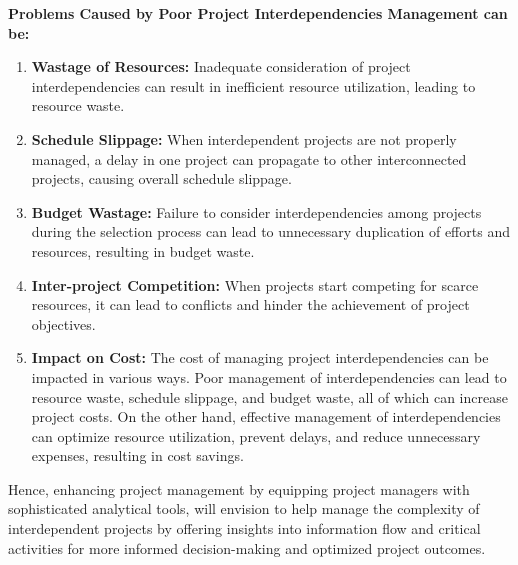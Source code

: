 \documentclass{llncs}
\begin{document}
\textbf{Problems Caused by Poor Project Interdependencies Management can be:}
\begin{enumerate}
\item \textbf{Wastage of Resources:} Inadequate consideration of project interdependencies can result in inefficient resource utilization, leading to resource waste.~\cite{refpaper2}~\cite{refpaper3}
\item \textbf{Schedule Slippage:} When interdependent projects are not properly managed, a delay in one project can propagate to other interconnected projects, causing overall schedule slippage.~\cite{refpaper2}~\cite{refpaper3}
\item \textbf{Budget Wastage:} Failure to consider interdependencies among projects during the selection process can lead to unnecessary duplication of efforts and resources, resulting in budget waste.~\cite{refpaper2}
\item\textbf{Inter-project Competition:} When projects start competing for scarce resources, it can lead to conflicts and hinder the achievement of project objectives.~\cite{refpaper2}~\cite{refpaper4}
\item\textbf{Impact on Cost:} The cost of managing project interdependencies can be impacted in various ways. Poor management of interdependencies can lead to resource waste, schedule slippage, and budget waste, all of which can increase project costs. On the other hand, effective management of interdependencies can optimize resource utilization, prevent delays, and reduce unnecessary expenses, resulting in cost savings.~\cite{refpaper2}
\end{enumerate}
Hence, enhancing project management by equipping project managers with sophisticated analytical tools, will envision to help manage the complexity of interdependent projects by offering insights into information flow and critical activities for more informed decision-making and optimized project outcomes.~\cite{refpaper5}
\end{document}
